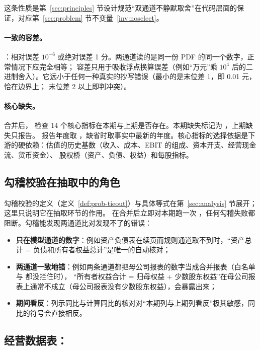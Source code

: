 这条性质是第~\ref{sec:principles} 节设计规范“双通道不静默取舍”在代码层面的保证，对应第~\ref{sec:problem} 节不变量~\ref{inv:noselect}。

\paragraph{一致的容差。}
：相对误差 $10^{-6}$ 或绝对误差 1 分。两通道读的是同一份 PDF 的同一个数字，正常情况下应完全相等；
容差只用于吸收浮点换算误差（例如“万元”乘 $10^4$ 后的二进制舍入）。它远小于任何一种真实的抄写错误（最小的是末位差 1，即 0.01 元，恰在边界上；
末位差 2 以上即判冲突）。

\paragraph{核心缺失。}
合并后， 检查 14 个核心指标在本期与上期是否存在。本期缺失标记为 ，上期缺失只报告。
报告年度取 ，缺省时取事实中最新的年度。核心指标的选择依据是下游的硬依赖：估值的历史基数（收入、成本、EBIT 的组成、资本开支、经营现金流、货币资金）、
股权桥（资产、负债、权益）和每股指标。

\subsection{勾稽校验在抽取中的角色}
\label{sec:ext-tieout}

勾稽校验的定义（定义~\ref{def:prob-tieout}）与具体等式在第~\ref{sec:analysis} 节展开；这里只说明它在抽取环节的作用。
 在合并后立即对本期跑一次 ，任何勾稽失败都阻断。勾稽能发现两通道比对发现不了的错误：
\begin{itemize}
\item \textbf{只在模型通道的数字}：例如资产负债表在续页而规则通道取不到时，“资产总计 = 负债和所有者权益总计”是唯一的自动核对；
\item \textbf{两通道一致地错}：例如两条通道都把母公司报表的数字当成合并报表（白名单与  都没拦住时），
      “所有者权益合计 = 归母权益 + 少数股东权益”在母公司报表上通常不成立（母公司报表没有少数股东权益），会暴露出来；
\item \textbf{期间看反}：列示同比与计算同比的核对对“本期列与上期列看反”极其敏感，同比的符号会直接相反。
\end{itemize}

\subsection{经营数据表：}
\label{sec:ext-extras}

